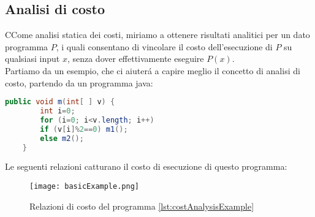 \documentclass[../../main.tex]{subfiles}
\begin{document}
\subsection{Analisi di costo}
CCome analisi statica dei costi, miriamo a ottenere risultati analitici per un dato programma $P$, i quali consentano di vincolare il costo dell'esecuzione di $P$ su qualsiasi input $x$, senza dover effettivamente eseguire $P(x)$.\autocite{albert2011closed}\\
Partiamo da un esempio, che ci aiuterá a capire meglio il concetto di analisi di costo, partendo da un programma java:
\begin{lstlisting}[language=Java, caption={Esempio di Analisi di Costo}, label={lst:costAnalysisExample}]
    public void m(int[ ] v) {
        int i=0;
        for (i=0; i<v.length; i++)
        if (v[i]%2==0) m1();
        else m2();
    }
\end{lstlisting}
Le seguenti relazioni catturano il costo di esecuzione di questo programma:
\begin{figure}[H]
    \centering
    \texttt{[image: basicExample.png]}
    \caption[short]{Relazioni di costo del programma \ref{lst:costAnalysisExample}}
\end{figure}
\end{document}
